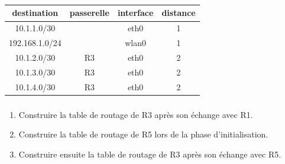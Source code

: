 \documentclass[svgnames,11pt]{beamer}
\begin{document}
\begin{frame}
    \frametitle{}

    \begin{center}
        \begin{tabular}{|*{4}{c|}}
            \hline
            destination    & passerelle & interface & distance \\
            \hline
            10.1.1.0/30    &            & eth0      & 1        \\
            \hline
            192.168.1.0/24 &            & wlan0     & 1        \\
            \hline
            10.1.2.0/30    & R3         & eth0      & 2        \\
            \hline
            10.1.3.0/30    & R3         & eth0      & 2        \\
            \hline
            10.1.4.0/30    & R3         & eth0      & 2        \\
            \hline
        \end{tabular}
    \end{center}

\end{frame}

\begin{frame}
    \frametitle{}

    \begin{activite}
        \begin{enumerate}
            \item Construire la table de routage de R3 après son échange avec R1.
            \item Construire la table de routage de R5 lors de la phase d'initialisation.
            \item Construire ensuite la table de routage de R3 après son échange avec R5.
        \end{enumerate}
    \end{activite}

\end{frame}
\end{document}

